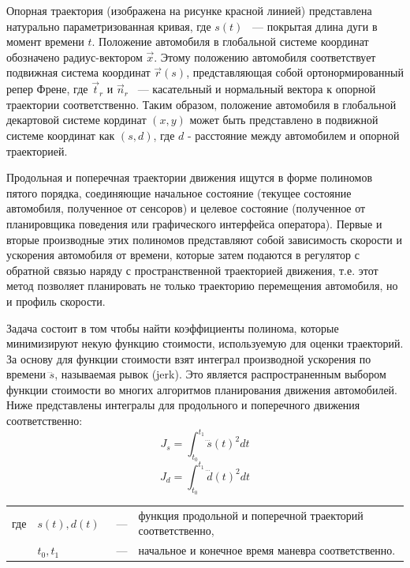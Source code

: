 Опорная траектория (изображена на рисунке красной линией) представлена натурально параметризованная кривая, где $s(t)$
~--- покрытая длина дуги в момент времени $t$. Положение автомобиля в глобальной системе координат обозначено
радиус-вектором $\vec{x}$. Этому положению автомобиля соответствует подвижная система координат $\vec{r}(s)$,
представляющая собой ортонормированный репер Френе, где $\vec{t}_r$ и $\vec{n}_r$ ~--- касательный и нормальный вектора
к опорной траектории соответственно. Таким образом, положение автомобиля в глобальной декартовой системе кординат
$(x, y)$ может быть представлено в подвижной системе координат как $(s, d)$, где $d$ - расстояние между автомобилем и
опорной траекторией.

Продольная и поперечная траектории движения ищутся в форме полиномов пятого порядка, соединяющие начальное состояние
(текущее состояние автомобиля, полученное от сенсоров) и целевое состояние (полученное от планировщика поведения или
графического интерфейса оператора). Первые и вторые производные этих
полиномов представляют собой зависимость скорости и ускорения автомобиля от времени, которые затем подаются в регулятор
с обратной связью наряду с пространственной траекторией движения, т.е. этот метод позволяет планировать не только
траекторию перемещения автомобиля, но и профиль скорости.

Задача состоит в том чтобы найти коэффициенты полинома, которые минимизируют некую функцию стоимости, используемую для
оценки траекторий. За основу для функции стоимости взят интеграл производной ускорения по времени $\dddot{s}$,
называемая рывок (jerk). Это является распространенным выбором функции стоимости во многих алгоритмов планирования
движения автомобилей. Ниже представлены интегралы для продольного и поперечного движения соответственно:
\begin{equation}
      \label{eq:lon_jerk_integral}
      J_s = \int_{t_0}^{t_1}{\dddot{s}(t)^2dt}
\end{equation}
\begin{equation}
      \label{eq:lat_jerk_integral}
      J_d = \int_{t_0}^{t_1}{\dddot{d}(t)^2dt}
\end{equation}

\noindent\begin{tabularx}{\linewidth}{lllX}
      где & $s(t), d(t)$ &~---& функция продольной и поперечной траекторий соответственно, \\
          & $t_0, t_1$   &~---& начальное и конечное время маневра соответственно. \\
\end{tabularx}

